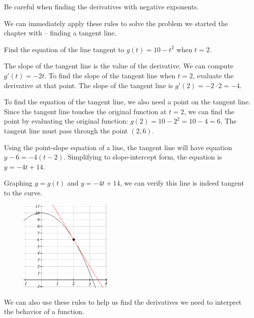 Be careful when finding the derivatives with negative exponents.

We can immediately apply these rules to solve the problem we started the chapter with -- finding a tangent line.

\begin{example}
Find the equation of the line tangent to $g(t)=10-t^2$ when $t=2$.

\begin{solution} The slope of the tangent line is the value of the derivative. We can compute $g'(t)=-2t$. To find the slope of the tangent line when $t=2$, evaluate the derivative at that point. The slope of the tangent line is $g'(2) = -2\cdot 2 = -4$.

To find the equation of the tangent line, we also need a point on the tangent line. Since the tangent line touches the original function at $t=2$, we can find the point by evaluating the original function: $g(2)=10-2^2 = 10-4 =6$. The tangent line must pass through the point $(2, 6)$.

Using the point-slope equation of a line, the tangent line will have equation $y-6=-4(t-2)$. Simplifying to slope-intercept form, the equation is $y=-4t+14$.

Graphing $y=g(t)$ and $y=-4t+14$, we can verify this line is indeed tangent to the curve.

\begin{figure}[!ht]
  \centering
    \includegraphics[width=0.4\textwidth]{img/chap2/image036.png}
\end{figure}
\end{solution}\end{example}

We can also use these rules to help us find the derivatives we need to interpret the behavior of a function.

